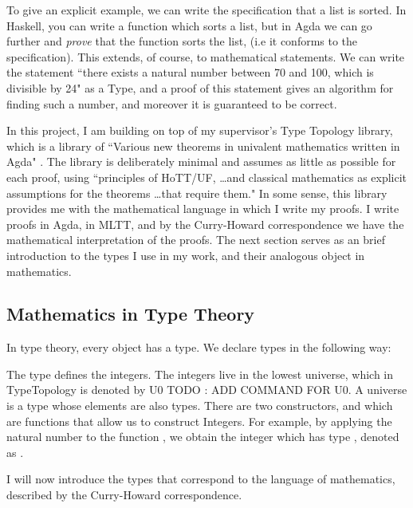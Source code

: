 \documentclass[ProjectReport]{subfiles}
\begin{document}
To give an explicit example, we can write the specification that a list is sorted. In Haskell, you can write a function which sorts a list, but in Agda we can go further and \textit{prove} that the function sorts the list, (i.e it conforms to the specification). This extends, of course, to mathematical statements. We can write the statement ``there exists a natural number between 70 and 100, which is divisible by 24" as a Type, and a proof of this statement gives an algorithm for finding such a number, and moreover it is guaranteed to be correct. 

In this project, I am building on top of my supervisor's Type Topology library, which is a library of ``Various new theorems in univalent mathematics written in Agda" \cite{TypeTopology}. The library is deliberately minimal and assumes as little as possible for each proof, using ``principles of HoTT/UF, \ldots and classical mathematics as explicit assumptions for the theorems \ldots that require them." In some sense, this library provides me with the mathematical language in which I write my proofs. I write proofs in Agda, in MLTT, and by the Curry-Howard correspondence we have the mathematical interpretation of the proofs.  The next section serves as an brief introduction to the types I use in my work, and their analogous object in mathematics.

\subsection{Mathematics in Type Theory}

In type theory, every object has a type. We declare types in the following way:

\TypeExample

The type  defines the integers. The integers live in the lowest universe, which in TypeTopology is denoted by U0 {TODO : ADD COMMAND FOR U0}. A universe is a type whose elements are also types. There are two constructors,  and  which are functions that allow us to construct Integers. For example, by applying the natural number  to the function , we obtain the integer \AgdaSpace{} which has type , denoted as
\AgdaSpace{}%
\AgdaSymbol{:}\AgdaSpace{}%
.

I will now introduce the types that correspond to the language of mathematics, described by the Curry-Howard correspondence. 
\end{document}
